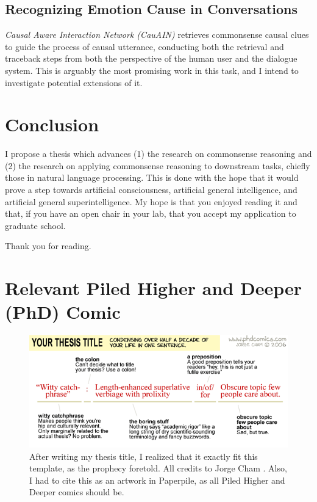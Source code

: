 \documentclass[12pt]{report}
\begin{document}
\section{Recognizing Emotion Cause in Conversations}
\textit{Causal Aware Interaction Network (CauAIN)} \cite{Zhao2022-hv} retrieves commonsense causal clues to guide the process of causal utterance, conducting both the retrieval and traceback steps from both the perspective of the human user and the dialogue system.
This is arguably the most promising work in this task, and I intend to investigate potential extensions of it.


\chapter{Conclusion}
I propose a thesis which advances (1) the research on commonsense reasoning and (2) the research on applying commonsense reasoning to downstream tasks, chiefly those in natural language processing.
This is done with the hope that it would prove a step towards artificial consciousness, artificial general intelligence, and artificial general superintelligence.
My hope is that you enjoyed reading it and that, if you have an open chair in your lab, that you accept my application to graduate school.

Thank you for reading.

\begin{footnotesize}
    
    
\end{footnotesize}

\appendix

\chapter{Relevant Piled Higher and Deeper (PhD) Comic}

\begin{figure}[h!]
    \includegraphics[width=\textwidth]{diagrams/phd-comics-718}
    \caption{After writing my thesis title, I realized that it exactly fit this template, as the prophecy foretold. All credits to Jorge Cham \cite{Cham2006-zx}. Also, I had to cite this as an artwork in Paperpile, as all Piled Higher and Deeper comics should be.}
\end{figure}
\end{document}
